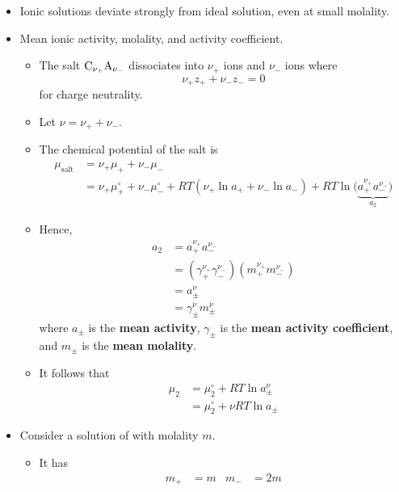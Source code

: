 \documentclass[../notes.tex]{subfiles}
\begin{document}
\begin{itemize}
    \item Ionic solutions deviate strongly from ideal solution, even at small molality.
    \item Mean ionic activity, molality, and activity coefficient.
    \begin{itemize}
        \item The salt $\ce{C}_{\nu_+}\ce{A}_{\nu_-}$ dissociates into $\nu_+$  ions and $\nu_-$  ions where
        \begin{equation*}
            \nu_+z_++\nu_-z_- = 0
        \end{equation*}
        for charge neutrality.
        \item Let $\nu=\nu_++\nu_-$.
        \item The chemical potential of the salt is
        \begin{align*}
            \mu_\text{salt} &= \nu_+\mu_++\nu_-\mu_-\\
            &= \nu_+\mu_+^\circ+\nu_-\mu_-^\circ+RT(\nu_+\ln a_++\nu_-\ln a_-)+RT\ln\big( \underbrace{a_+^{\nu_+}a_-^{\nu_-}}_{a_2} \big)
        \end{align*}
        \item Hence,
        \begin{align*}
            a_2 &= a_+^{\nu_+}a_-^{\nu_-}\\
            &= (\gamma_+^{\nu_+}\gamma_-^{\nu_-})(m_+^{\nu_+}m_-^{\nu_-})\\
            &= a_\pm^\nu\\
            &= \gamma_\pm^\nu m_\pm^\nu
        \end{align*}
        where $a_\pm$ is the \textbf{mean activity}, $\gamma_\pm$ is the \textbf{mean activity coefficient}, and $m_\pm$ is the \textbf{mean molality}.
        \item It follows that
        \begin{align*}
            \mu_2 &= \mu_2^\circ+RT\ln a_\pm^\nu\\
            &= \mu_2^\circ+\nu RT\ln a_\pm
        \end{align*}
    \end{itemize}
    \item Consider a solution of  with molality $m$.
    \begin{itemize}
        \item It has
        \begin{align*}
            m_+ &= m&
            m_- &= 2m
        \end{align*}

\end{itemize}
\end{itemize}
\end{document}

